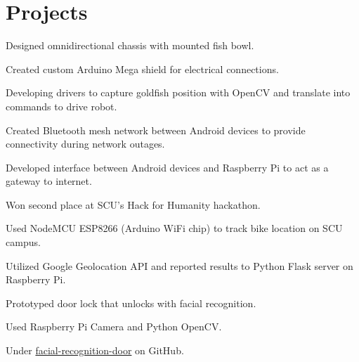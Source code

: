 \documentclass[]{deedy-resume-openfont}
\begin{document}
\begin{minipage}[t]{0.66\textwidth}

\section{Projects}
\begin{tightemize}
\item Designed omnidirectional chassis with mounted fish bowl. 
\item Created custom Arduino Mega shield for electrical connections.
\item Developing drivers to capture goldfish position with OpenCV and translate into commands to drive robot.
\end{tightemize}
\sectionsep

\begin{tightemize}
\item Created Bluetooth mesh network between Android devices to provide connectivity during network outages.
\item Developed interface between Android devices and Raspberry Pi to act as a gateway to internet.
\item Won second place at SCU's Hack for Humanity hackathon.
\end{tightemize}
\sectionsep


\begin{tightemize}
\item Used NodeMCU ESP8266 (Arduino WiFi chip) to track bike location on SCU campus.
\item Utilized Google Geolocation API and reported results to Python Flask server on Raspberry Pi.
\end{tightemize}
\sectionsep

\begin{tightemize}
\item Prototyped door lock that unlocks with facial recognition. 
\item Used Raspberry Pi Camera and Python OpenCV.
\item Under {\href{https://github.com/zachbellay/facial-recognition-door}{facial-recognition-door}} on GitHub.
\end{tightemize}
\sectionsep




\end{minipage} 
\end{document}

